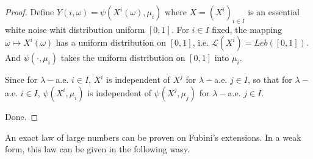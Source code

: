 \begin{proof}
	Define 
	$ Y(i,\omega)= \psi(X^i(\omega), \mu_i)$ where $X = (X^i)_{i\in I}$ is an essential white noise whit distribution uniform $[0,1]$. For $i \in I$ fixed, the mapping $\omega \mapsto X^i(\omega)	$
	has a uniform distribution on $[0,1]$, i.e. $\mathcal{L}(X^i) = Leb([0,1])$.
	And $\psi(\cdot, \mu_i)$ takes the uniform distribution on $[0,1]$  into $\mu_i$. 
	
	Since for $\lambda-$a.e. $i \in I$, $X^i$ is independent of $X^j$ for $\lambda-$a.e. $j \in I$, so that for $\lambda-$a.e. $i \in I$, $\psi(X^i, \mu_i)$ is independent of $\psi(X^j, \mu_j)$ for $\lambda-$a.e. $j \in I$. 
	
	Done. 
\end{proof}

An exact law of large numbers can be proven  on Fubini's extensions. In a weak form, this law can be given in the following wasy.

